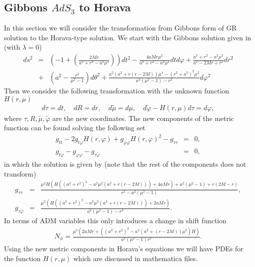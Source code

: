 \documentclass[preprint,aps,tightenlines,showkeys,nofootinbib,superscriptaddress,amsmath]{revtex4}
\begin{document}
\subsection{Gibbons $AdS_3$ to Horava}
In this section we will consider the transformation from Gibbons form
of GR solution to the Horava-type solution. We start with the Gibbons
solution given in \cite{Gibb:2004} (with $\lambda = 0$)
\begin{eqnarray}
ds^{2} &= & \left(  -1+\left(\frac{2Mr}{a^{2}+r^{2}-a^{2}\mu ^{2}
}\right)\right)dt^2
-\frac{4aMr \mu^{2}}{a^{2}+r^{2}-a^2 \mu^2   }dt d
\varphi+\frac{a^{2}+r^{2}-a^{2}\mu ^{2}    }{a^{2}-2Mr+r^{2}  }dr^2
\nonumber\\
& +& \left(a^{2} - \frac{r^{2}}{\mu ^{2}-1 } \right)d \theta ^{2}
+\frac{a^2(a^2+r(r-2M))\mu ^{4}-(r^2+a^2)^2 \mu ^2}{a^2(\mu
^2-1)-r^2 }d \varphi ^2
\end{eqnarray}
Then we consider the following transformation with the unknown
function $H(r,\mu )$
\begin{eqnarray}
d \tau  = dt,\quad dR=dr,\quad d \tilde \mu  = d \mu, \quad d
\tilde \varphi -H(r,\mu )d \tau = d \varphi,
\end{eqnarray}
where $\tau ,R,\tilde \mu , \tilde \varphi $ are the new coordinates.
The new components of the metric
function can be found solving the following set
\begin{eqnarray}
g_{t t}-2g_{t \varphi }H(r,\varphi )+g_{\varphi \varphi
}H(r,\varphi )^{2}-g_{\tau \tau }&=&0,\\
g_{t \varphi }-g_{\varphi  \varphi }-g_{\tau \tilde \varphi }&=&0,
\end{eqnarray}
in which the solution is given by (note that the rest of the
components does not transform)
\begin{eqnarray}
g_{\tau \tau} &=& \frac{{\mu }^2 H \left(H
    \left(\left(a^2+r^2\right)^2-a^2 {\mu }^2 \left(a^2+r (r-2
  M)\right)\right)+4 a M r\right)+a^2 \left({\mu }^2-1\right)+r (2
M-r)}{r^2-a^2 \left({\mu }^2-1\right)},\\
g_{\tau \tilde\varphi} &=&\frac{\mu ^2 \left(H
    \left(\left(a^2+r^2\right)^2-a^2 \mu ^2 \left(a^2+r (r-2
M)\right)\right)+2 a M r\right)}{a^2 \left(\mu ^2-1\right)-r^2}.
\end{eqnarray}
In terms of ADM variables this only introduces a change in shift function
\begin{eqnarray}
N_{\phi} = \frac{\mu ^{2}(2aMr+((a^{2}+r^2 )^{2}-a^{2}(a^{2}+(r-2M)
)\mu ^{2}   )H) }{a^{2}(\mu^{2}-1 ) r^{2} }.
\end{eqnarray}
Using the new metric components in Horava's equations we will have
PDEs for the function $H(r,\mu )$ which are discussed in mathematica files.
\end{document}
